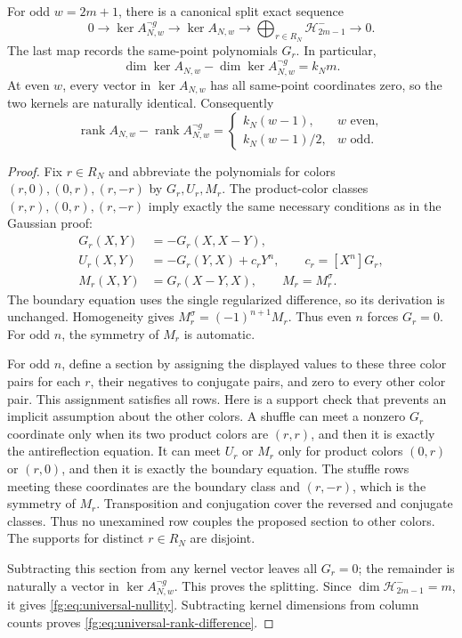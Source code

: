 \begin{theorem}\label{fg:thm:universal}
For odd $w=2m+1$, there is a canonical split exact sequence
\[
 0\longrightarrow\ker A_{N,w}^{\neg g}
 \longrightarrow\ker A_{N,w}
 \longrightarrow\bigoplus_{r\in R_N}\mathcal H_{2m-1}^-
 \longrightarrow0.
\]
The last map records the same-point polynomials $G_r$.
In particular,
\begin{equation}\label{fg:eq:universal-nullity}
 \dim\ker A_{N,w}-\dim\ker A_{N,w}^{\neg g}=k_Nm.
\end{equation}
At even $w$, every vector in $\ker A_{N,w}$ has all same-point
coordinates zero, so the two kernels are naturally identical.
Consequently
\begin{equation}\label{fg:eq:universal-rank-difference}
 \operatorname{rank}A_{N,w}-\operatorname{rank}A_{N,w}^{\neg g}
 =\begin{cases}
    k_N(w-1),&w\text{ even},\\
    k_N(w-1)/2,&w\text{ odd}.
  \end{cases}
\end{equation}
\end{theorem}
\begin{proof}
Fix $r\in R_N$ and abbreviate the polynomials for colors
$(r,0),(0,r),(r,-r)$ by $G_r,U_r,M_r$. The product-color classes
$(r,r),(0,r),(r,-r)$ imply exactly the same necessary conditions
as in the Gaussian proof:
\begin{align*}
 G_r(X,Y)&=-G_r(X,X-Y),\\
 U_r(X,Y)&=-G_r(Y,X)+c_rY^n,\qquad c_r=[X^n]G_r,\\
 M_r(X,Y)&=G_r(X-Y,X),\qquad M_r=M_r^\sigma.
\end{align*}
The boundary equation uses the single regularized difference,
so its derivation is unchanged. Homogeneity gives
$M_r^\sigma=(-1)^{n+1}M_r$. Thus even $n$ forces $G_r=0$.
For odd $n$, the symmetry of $M_r$ is automatic.

For odd $n$, define a section by assigning the displayed values to
these three color pairs for each $r$, their negatives to conjugate
pairs, and zero to every other color pair. This assignment satisfies
all rows. Here is a support check that prevents an implicit assumption
about the other colors. A shuffle can meet a nonzero $G_r$ coordinate
only when its two product colors are $(r,r)$, and then it is exactly
the antireflection equation. It can meet $U_r$ or $M_r$ only for
product colors $(0,r)$ or $(r,0)$, and then it is exactly the boundary
equation. The stuffle rows meeting these coordinates are the boundary
class and $(r,-r)$, which is the symmetry of $M_r$. Transposition
and conjugation cover the reversed and conjugate classes. Thus no
unexamined row couples the proposed section to other colors.
The supports for distinct $r\in R_N$ are disjoint.

Subtracting this section from any kernel vector leaves all $G_r=0$;
the remainder is naturally a vector in $\ker A_{N,w}^{\neg g}$.
This proves the splitting. Since
$\dim\mathcal H_{2m-1}^-=m$, it gives
\eqref{fg:eq:universal-nullity}. Subtracting kernel dimensions from
column counts proves \eqref{fg:eq:universal-rank-difference}.
\end{proof}

